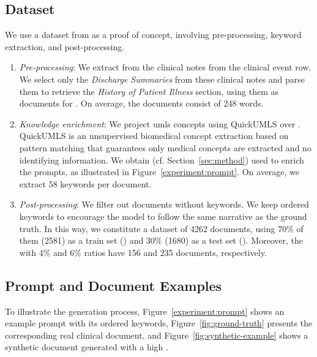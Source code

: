 \subsection{Dataset}
\label{subsec:dataset}
We use a dataset from \mimic as a proof of concept, involving pre-processing, keyword extraction, and post-processing.
\begin{enumerate}
    \item \textit{Pre-processing}: We extract from \mimic the clinical notes from the clinical event row. We select only the \textit{Discharge Summaries} from these clinical notes and parse them to retrieve the \textit{History of Patient Illness} section, using them as documents for \dgen. On average, the documents consist of 248 words.
    
    \item \textit{Knowledge enrichment}: We project \gls{umls} concepts using QuickUMLS over \dgen. QuickUMLS is an unsupervised biomedical concept extraction based on pattern matching that guarantees only medical concepts are extracted and no identifying information. We obtain \kgen (cf. Section~\ref{sec:method}) used to enrich the prompts, as illustrated in Figure~\ref{experiment:prompt}. On average, we extract 58 keywords per document.
    
    \item \textit{Post-processing}: We filter out documents without keywords. We keep ordered keywords to encourage the model to follow the same narrative as the ground truth.
    In this way, we constitute a dataset of \num{4262} documents, using 70\% of them (\num{2581}) as a train set (\dtr) and 30\% (\num{1680}) as a test set (\dte). Moreover, the \dsft with 4\% and 6\% ratios have \num{156} and \num{235} documents, respectively.
\end{enumerate}

\subsection{Prompt and Document Examples}

To illustrate the generation process, Figure~\ref{experiment:prompt} shows an example prompt with its ordered keywords, Figure~\ref{fig:ground-truth} presents the corresponding real clinical document, and Figure~\ref{fig:synthetic-example} shows a synthetic document generated with a high \score.

